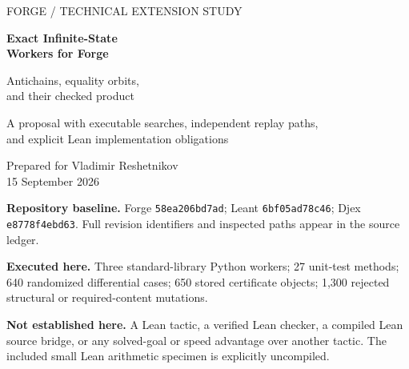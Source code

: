 \documentclass[11pt,a4paper]{article}
\newcommand{\code}[1]{\texttt{\small #1}}
\theoremstyle{definition}
\theoremstyle{remark}
\begin{document}
\hypersetup{pageanchor=false}
\begin{titlepage}
\thispagestyle{empty}
\vspace*{17mm}
{\large FORGE / TECHNICAL EXTENSION STUDY\par}
\vspace{13mm}
{\Huge\bfseries Exact Infinite-State\\[4pt] Workers for Forge\par}
\vspace{9mm}
{\LARGE Antichains, equality orbits,\\[3pt] and their checked product\par}
\vspace{13mm}
{\large A proposal with executable searches, independent replay paths,\\and explicit Lean implementation obligations\par}
\vspace{11mm}
Prepared for Vladimir Reshetnikov\\
15 September 2026
\vfill
\noindent\begin{minipage}{\textwidth}
\textbf{Repository baseline.} Forge \code{58ea206bd7ad}; Leant
\code{6bf05ad78c46}; Djex \code{e8778f4ebd63}. Full revision identifiers
and inspected paths appear in the source ledger.\par\medskip
\textbf{Executed here.} Three standard-library Python workers; 27 unit-test
methods; 640 randomized differential cases; 650 stored certificate objects;
1,300 rejected structural or required-content mutations.\par\medskip
\textbf{Not established here.} A Lean tactic, a verified Lean checker, a compiled
Lean source bridge, or any solved-goal or speed advantage over another tactic.
The included small Lean arithmetic specimen is explicitly uncompiled.
\end{minipage}
\end{titlepage}
\hypersetup{pageanchor=true}
\end{document}

